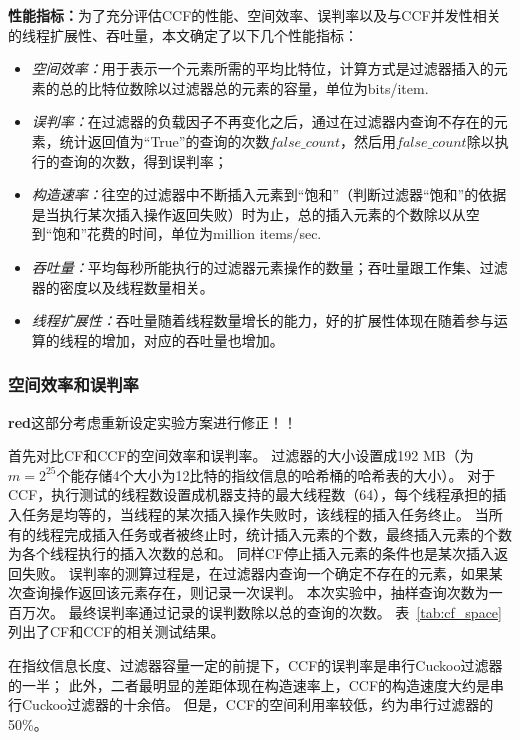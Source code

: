\textbf{性能指标：}为了充分评估CCF的性能、空间效率、误判率以及与CCF并发性相关的线程扩展性、吞吐量，本文确定了以下几个性能指标：
\begin{itemize}
 \item \textit{空间效率：}用于表示一个元素所需的平均比特位，计算方式是过滤器插入的元素的总的比特位数除以过滤器总的元素的容量，单位为bits/item.
 \item \textit{误判率：}在过滤器的负载因子不再变化之后，通过在过滤器内查询不存在的元素，统计返回值为“True”的查询的次数$false\_count$，然后用$false\_count$除以执行的查询的次数，得到误判率；
 \item \textit{构造速率：}往空的过滤器中不断插入元素到“饱和”（判断过滤器“饱和”的依据是当执行某次插入操作返回失败）时为止，总的插入元素的个数除以从空到“饱和”花费的时间，单位为million items/sec.
 \item \textit{吞吐量：}平均每秒所能执行的过滤器元素操作的数量；吞吐量跟工作集、过滤器的密度以及线程数量相关。
 \item \textit{线程扩展性：}吞吐量随着线程数量增长的能力，好的扩展性体现在随着参与运算的线程的增加，对应的吞吐量也增加。
\end{itemize}    

\subsubsection{空间效率和误判率}
\textbf{red}{这部分考虑重新设定实验方案进行修正！！}

首先对比CF和CCF的空间效率和误判率。
过滤器的大小设置成192 MB（为$m = 2^{25}$个能存储4个大小为12比特的指纹信息的哈希桶的哈希表的大小）。
对于CCF，执行测试的线程数设置成机器支持的最大线程数（64），每个线程承担的插入任务是均等的，当线程的某次插入操作失败时，该线程的插入任务终止。
当所有的线程完成插入任务或者被终止时，统计插入元素的个数，最终插入元素的个数为各个线程执行的插入次数的总和。
同样CF停止插入元素的条件也是某次插入返回失败。
误判率的测算过程是，在过滤器内查询一个确定不存在的元素，如果某次查询操作返回该元素存在，则记录一次误判。
本次实验中，抽样查询次数为一百万次。
最终误判率通过记录的误判数除以总的查询的次数。
表~\ref{tab:cf_space}列出了CF和CCF的相关测试结果。

在指纹信息长度、过滤器容量一定的前提下，CCF的误判率是串行Cuckoo过滤器的一半；
此外，二者最明显的差距体现在构造速率上，CCF的构造速度大约是串行Cuckoo过滤器的十余倍。
但是，CCF的空间利用率较低，约为串行过滤器的50\%。

